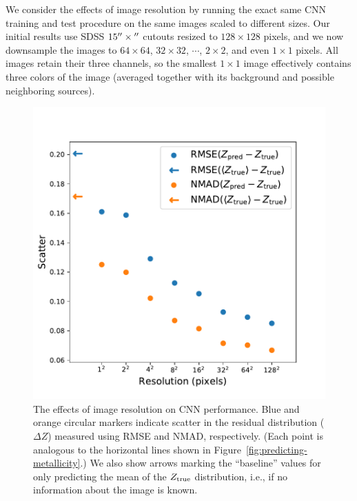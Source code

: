 \documentclass[fleqn,usenatbib]{mnras}
\begin{document}
We consider the effects of image resolution by running the exact same CNN training and test procedure on the same images scaled to different sizes.
Our initial results use SDSS $15\hbox{$^{\prime\prime}$} \times \hbox{$^{\prime\prime}$}$ cutouts resized to $128\times 128$ pixels, and we now downsample the images to $64\times 64$, $32 \times 32$, $\cdots$, $2\times 2$, and even $1\times 1$ pixels.
All images retain their three channels, so the smallest $1 \times 1$ image effectively contains three colors of the image (averaged together with its background and possible neighboring sources).


\begin{figure}
	\includegraphics[width=\columnwidth]{04-resolution.pdf}
	\caption{\label{fig:resolution}
		The effects of image resolution on CNN performance.
		Blue and orange circular markers indicate scatter in the residual distribution ($\Delta Z$) measured using RMSE and NMAD, respectively.
		(Each point is analogous to the horizontal lines shown in Figure~\ref{fig:predicting-metallicity}.)
		We also show arrows marking the ``baseline'' values for only predicting the mean of the $Z_{\rm true}$ distribution, i.e., if no information about the image is known.
	}
\end{figure}
\end{document}
